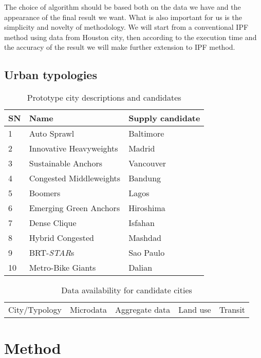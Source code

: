 \documentclass[11pt,twoside]{article}
\numberwithin{equation}{section}
\newcommand{\?}{\stackrel{?}{=}}
\begin{document}
The choice of algorithm should be based both on the data we have and the appearance of the final result we want.
What is also important for us is the simplicity and novelty of methodology.
We will start from a conventional IPF method using data from Houston city, then according to the execution time and the accuracy of the result we will make further extension to IPF method.

\subsection{Urban typologies}
\begin{table}[h!]
  \centering
  \caption{Prototype city descriptions and candidates}
  \label{tab:proto}
  \begin{tabular}{l l l}\toprule
    \bf SN &\bf Name &\bf Supply candidate \\\midrule
    1 & Auto Sprawl & Baltimore \\
    2 & Innovative Heavyweights & Madrid \\
    3 & Sustainable Anchors & Vancouver \\
    4 & Congested Middleweights & Bandung \\
    5 & Boomers & Lagos \\
    6 & Emerging Green Anchors & Hiroshima \\
    7 & Dense Clique & Isfahan\\
    8 & Hybrid Congested & Mashdad \\
    9 & BRT-{\it STAR}s & Sao Paulo  \\
    10 & Metro-Bike Giants & Dalian \\ \bottomrule
  \end{tabular}
\end{table}

\begin{table}[h!]
  \centering
  \caption{Data availability for candidate cities}
  \label{tab:avail}
  \begin{tabular}{l l l l l }
    City/Typology & Microdata & Aggregate data & Land use & Transit \\
  \end{tabular}
\end{table}


\section{Method}
\end{document}
